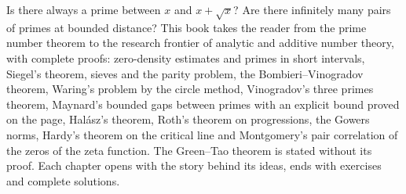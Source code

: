 Is there always a prime between $x$ and $x+\sqrt x$? Are there infinitely many pairs of primes at bounded distance? This book takes the reader from the prime number theorem to the research frontier of analytic and additive number theory, with complete proofs: zero-density estimates and primes in short intervals, Siegel's theorem,
sieves and the parity problem, the Bombieri--Vinogradov theorem, Waring's problem by the circle method, Vinogradov's three primes theorem, Maynard's bounded gaps between primes with an explicit bound proved on the page, Hal\'asz's theorem, Roth's theorem on progressions, the Gowers norms, Hardy's theorem on the critical line and Montgomery's pair correlation of the zeros of the zeta function. The Green--Tao theorem is stated without its proof. Each chapter opens with the
story behind its ideas, ends with exercises and complete solutions.
